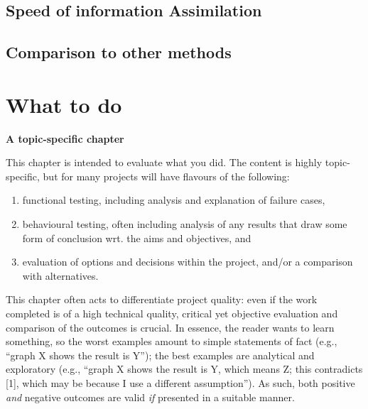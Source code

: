 \documentclass[ oneside,%
                    author={Joshua Felmeden},
                    degree={MEng},
                     title={Semantic Analysis of Financial Headlines Based on Realised Stock Returns},
                  subtitle={}]{dissertation}
\begin{document}


\subsection{Speed of information Assimilation}

\subsection{Comparison to other methods}

\section{What to do}

{\bf A topic-specific chapter} 
\vspace{1cm} 

\noindent
This chapter is intended to evaluate what you did.  The content is highly 
topic-specific, but for many projects will have flavours of the following:

\begin{enumerate}
\item functional  testing, including analysis and explanation of failure 
      cases,
\item behavioural testing, often including analysis of any results that 
      draw some form of conclusion wrt. the aims and objectives,
      and
\item evaluation of options and decisions within the project, and/or a
      comparison with alternatives.
\end{enumerate}

\noindent
This chapter often acts to differentiate project quality: even if the work
completed is of a high technical quality, critical yet objective evaluation 
and comparison of the outcomes is crucial.  In essence, the reader wants to
learn something, so the worst examples amount to simple statements of fact 
(e.g., ``graph X shows the result is Y''); the best examples are analytical 
and exploratory (e.g., ``graph X shows the result is Y, which means Z; this 
contradicts [1], which may be because I use a different assumption'').  As 
such, both positive {\em and} negative outcomes are valid {\em if} presented 
in a suitable manner.
\end{document}
